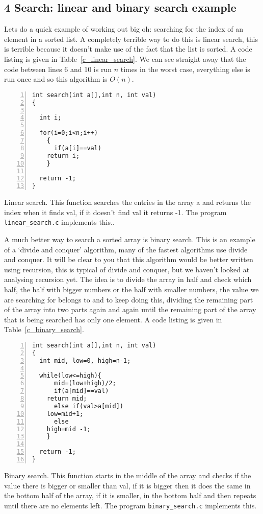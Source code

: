 \documentclass[11pt,a4paper]{scrartcl}
\begin{document}
\subsection*{4 Search: linear and binary search example}

Lets do a quick example of working out big oh: searching for the index
of an element in a sorted list. A completely terrible way to do this
is linear search, this is terrible because it doesn't make use of the
fact that the list is sorted. A code listing is given in
Table~\ref{c_linear_search}. We can see straight away that the code
between lines 6 and 10 is run $n$ times in the worst case, everything
else is run once and so this algorithm is $O(n)$.

\begin{table}
\begin{lstlisting}[numbers=left]
int search(int a[],int n, int val)
{

  int i;

  for(i=0;i<n;i++)
    {
      if(a[i]==val)
	return i;
    }

  return -1;
}
\end{lstlisting}
\caption{Linear search. This function searches the entries in the array a and returns the index when it finds val, if it doesn't find val it returns -1. The program {\tt linear\_search.c} implements this.\label{c_linear_search}.}
\end{table}

A much better way to search a sorted array is binary search. This is
an example of a \lq{}divide and conquer\rq{} algorithm, many of the
fastest algorithms use divide and conquer. It will be clear to you
that this algorithm would be better written using recursion, this is
typical of divide and conquer, but we haven't looked at analysing
recursion yet. The idea is to divide the array in half and check which
half, the half with bigger numbers or the half with smaller numbers,
the value we are searching for belongs to and to keep doing this,
dividing the remaining part of the array into two parts again and again
until the remaining part of the array that is being searched has only
one element. A code listing is given in Table~\ref{c_binary_search}.

\begin{table}
\begin{lstlisting}[numbers=left] 
int search(int a[],int n, int val)
{
  int mid, low=0, high=n-1;

  while(low<=high){
      mid=(low+high)/2;
      if(a[mid]==val)
	return mid;
      else if(val>a[mid])
	low=mid+1;
      else
	high=mid -1;
    }

  return -1;
}
\end{lstlisting}
\caption{Binary search. This function starts in the middle of the array
  and checks if the value there is bigger or smaller than val, if it
  is bigger then it does the same in the bottom half of the array, if it
  is smaller, in the bottom half and then repeats until there are no
  elements left. The program {\tt binary\_search.c} implements
  this.\label{c_binary_search}}
\end{table}
\end{document}

